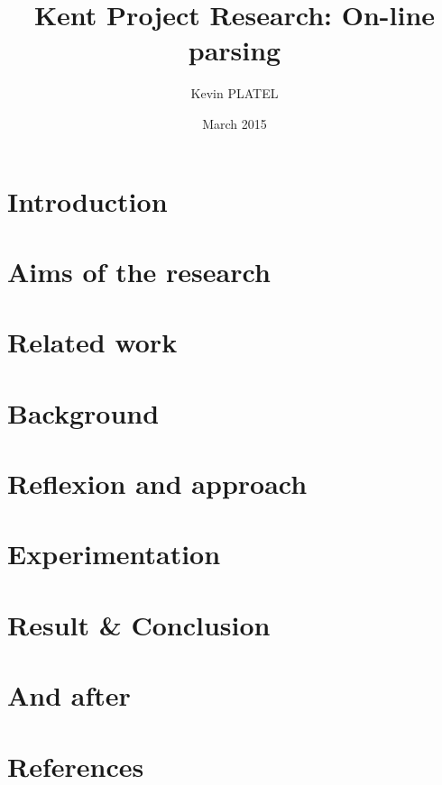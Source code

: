 \documentclass[11pt]{article}
\title{Kent Project Research: On-line parsing}
\author{Kevin PLATEL}
\date{March 2015}
\begin{document}
\maketitle

\renewcommand{\contentsname}{Abstract}

\renewcommand{\contentsname}{Table of contents}
\tableofcontents

\newpage{}

\section{Introduction}


\section{Aims of the research}

\section{Related work}

\section{Background}


\section{Reflexion and approach}

\section{Experimentation}

\section{Result \& Conclusion}

\section{And after}

\section{References}
\nocite{*}
 
\printbibliography
\end{document}

